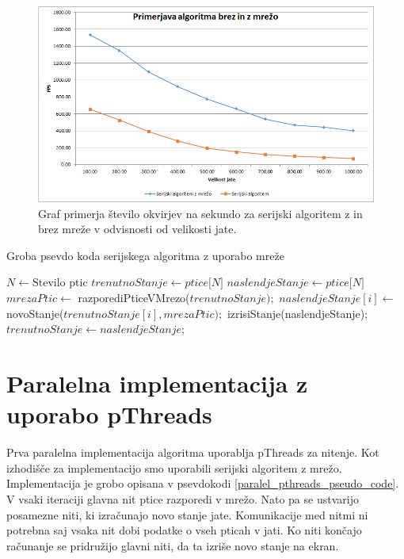 \documentclass[a4paper, 12pt]{book}
\begin{document}
\begin{figure}[t]
\includegraphics[width=\textwidth]{graf_serial_alg}
\caption{Graf primerja število okvirjev na sekundo za serijski algoritem z in brez mreže v odvisnosti od velikosti jate.}
\label{img:graf_serial_alg}
\centering
\end{figure}

\begin{algorithm}
\caption{Groba psevdo koda serijskega algoritma z uporabo mreže}\label{serial_grid_pseudo_code}
\begin{algorithmic}[1]
\State $N \gets \text{Stevilo ptic}$
\State $trenutnoStanje \gets \textit{ptice[N]}$
\State $naslendjeStanje \gets \textit{ptice[N]}$
\Loop
\State $mrezaPtic \gets$ razporediPticeVMrezo($trenutnoStanje);$
\State $naslendjeStanje[i] \gets$ novoStanje($trenutnoStanje[i], mrezaPtic);$
\EndFor
\State izrisiStanje(naslendjeStanje);
\State $trenutnoStanje \gets naslendjeStanje;$
\EndLoop
\end{algorithmic}
\end{algorithm}

\chapter{Paralelna implementacija z uporabo pThreads}
\label{ch2}
Prva paralelna implementacija algoritma uporablja pThreads za nitenje. Kot izhodišče za implementacijo smo uporabili serijski algoritem z mrežo. Implementacija je grobo opisana v psevdokodi \ref{paralel_pthreads_pseudo_code}. V vsaki iteraciji glavna nit ptice razporedi v mrežo. Nato pa se ustvarijo posamezne niti, ki izračunajo novo stanje jate. Komunikacije med nitmi ni potrebna saj vsaka nit dobi podatke o vseh pticah v jati. Ko niti končajo računanje se pridružijo glavni niti, da ta izriše novo stanje na ekran.
\end{document}
